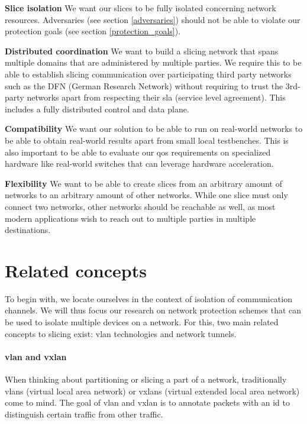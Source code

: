 \begin{description}[style=multiline, labelwidth=0.7cm]
    \item[\namedlabel{R1}{R1}] \textbf{Slice isolation} We want our slices to be fully isolated concerning network resources. Adversaries (see section \ref{adversaries}) should not be able to violate our protection goals (see section \ref{protection_goals}).
    \item[\namedlabel{R2}{R2}] \textbf{Distributed coordination} We want to build a slicing network that spans multiple domains that are administered by multiple parties. We require this to be able to establish slicing communication over participating third party networks such as the DFN (German Research Network) without requiring to trust the 3rd-party networks apart from respecting their \acrshort{sla} (service level agreement). This includes a fully distributed control and data plane.
    \item[\namedlabel{R3}{R3}] \textbf{Compatibility} We want our solution to be able to run on real-world networks to be able to obtain real-world results apart from small local testbenches. This is also important to be able to evaluate our \acrshort{qos} requirements on specialized hardware like real-world switches that can leverage hardware acceleration.
    \item[\namedlabel{R4}{R4}] \textbf{Flexibility} We want to be able to create slices from an arbitrary amount of networks to an arbitrary amount of other networks. While one slice must only connect two networks, other networks should be reachable as well, as most modern applications wish to reach out to multiple parties in multiple destinations.
\end{description}

\section{Related concepts}
To begin with, we locate ourselves in the context of isolation of communication channels. We will thus focus our research on network protection schemes that can be used to isolate multiple devices on a network. For this, two main related concepts to slicing exist: \acrshort{vlan} technologies and network tunnels.

\paragraph{\acrshort{vlan} and \acrshort{vxlan}} When thinking about partitioning or slicing a part of a network, traditionally \acrshort{vlan}s (virtual local area network) \cite{IEEE8021Q} or \acrshort{vxlan}s (virtual extended local area network) \cite{rfc7348} come to mind. The goal of \acrshort{vlan} and \acrshort{vxlan} is to annotate packets with an id to distinguish certain traffic from other traffic.

